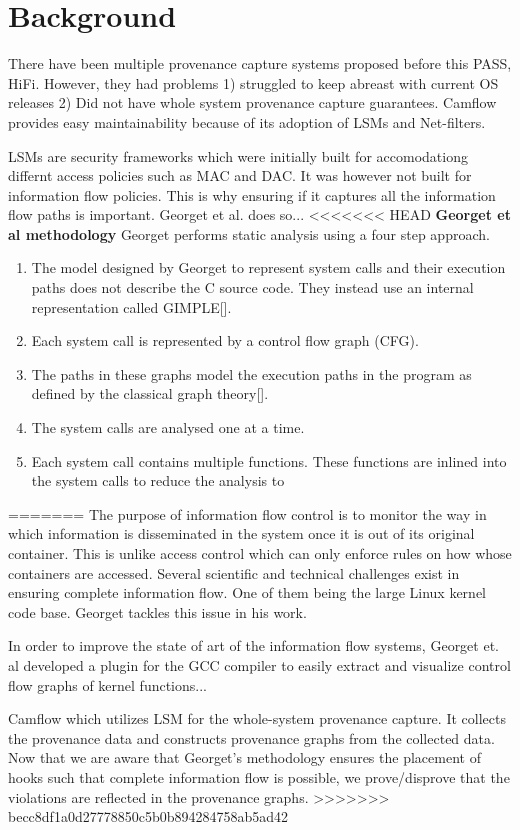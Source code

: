 \section{Background}

\label{A small recap into data provenance and whole system provenance capture}

There have been multiple provenance capture systems proposed before this PASS, HiFi. However, they had problems 1) struggled to keep abreast with current OS releases 2) Did not have whole system provenance capture guarantees. Camflow provides easy maintainability because of its adoption of LSMs and Net-filters.
\vskip 0.1in
\label{LSMs}

LSMs are security frameworks which were initially built for accomodationg differnt access policies such as MAC and DAC. It was however not built for information flow policies. This is why ensuring if it captures all the information flow paths is important. Georget et al. does so...
\vskip 0.1in
<<<<<<< HEAD
\textbf{Georget et al methodology}
Georget performs static analysis using a four step approach. 
\begin{enumerate}
	\item The model designed by Georget to represent system calls and their execution paths does not describe the C source code. They instead use an internal representation called GIMPLE[]. 
	\item Each system call is represented by a control flow graph (CFG). 
	\item The paths in these graphs model the execution paths in the program as defined by the classical graph theory[].
	\item The system calls are analysed one at a time. 
	\item Each system call contains multiple functions. These functions are inlined into the system calls to reduce the analysis to 
\end{enumerate}
=======
\label{Information flow}
The purpose of information flow control is to monitor the way in which information is disseminated in the system once it is out of its original container. This is unlike access control which can only enforce rules on how whose containers are accessed. Several scientific and technical challenges exist in ensuring complete information flow. One of them being the large Linux kernel code base. Georget tackles this issue in his work.



\label{Georget methodology}
In order to improve the state of art of the information flow systems, Georget et. al developed a  plugin for the GCC compiler to easily extract and visualize control flow graphs of kernel functions...


\label{Camflow}
Camflow which utilizes LSM for the whole-system provenance capture. It collects the provenance data and constructs provenance graphs from the collected data. Now that we are aware that Georget's methodology ensures the placement of hooks such that complete information flow is possible, we prove/disprove that the violations are reflected in the provenance graphs.
>>>>>>> becc8df1a0d27778850c5b0b894284758ab5ad42
